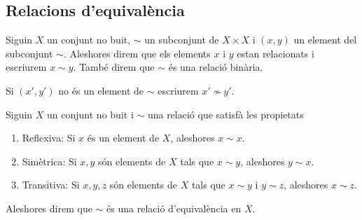 \documentclass[../../Main.tex]{subfiles}
\begin{document}
	\subsection{Relacions d'equivalència}
	\begin{definition}
		\label{def:relació binària}
		Siguin \(X\) un conjunt no buit, \(\sim\) un subconjunt de \(X\times X\) i \((x,y)\) un element del subconjunt \(\sim\). Aleshores direm que els elements \(x\) i \(y\) estan relacionats i escriurem \(x\sim y\). També direm que \(\sim\) és una relació binària.
		
		Si \((x',y')\) no és un element de \(\sim\) escriurem \(x'\nsim y'\).
	\end{definition}
	\begin{definition}
		\label{def:relació d'equivalència}
		Siguin \(X\) un conjunt no buit i \(\sim\) una relació que satisfà les propietats
		\begin{enumerate}
			\item Reflexiva: Si \(x\) és un element de \(X\), aleshores \(x\sim x\).
			\item Simètrica: Si \(x,y\) són elements de \(X\) tals que \(x\sim y\), aleshores \(y\sim x\).
			\item Transitiva: Si \(x,y,z\) són elements de \(X\) tals que \(x\sim y\) i \(y\sim z\), aleshores \(x\sim z\).
		\end{enumerate}
		Aleshores direm que \(\sim\) és una relació d'equivalència en \(X\).
	\end{definition}
\end{document}

